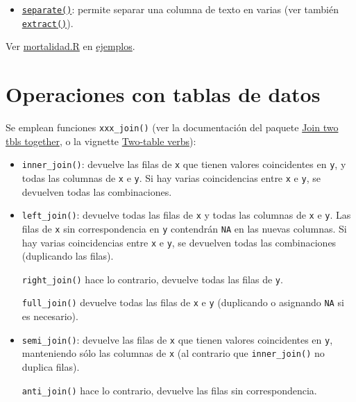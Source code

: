 \documentclass[
]{book}
\providecommand{\tightlist}{%
  \setlength{\itemsep}{0pt}\setlength{\parskip}{0pt}}
\theoremstyle{break}
\theoremstyle{nonumberplain}
\begin{document}
\begin{itemize}
\tightlist
\item
  \href{https://tidyr.tidyverse.org/reference/separate.html}{\texttt{separate()}}: permite separar una columna de texto en varias (ver también \href{https://tidyr.tidyverse.org/reference/extract.html}{\texttt{extract()}}).
\end{itemize}

Ver \href{ejemplos/mortalidad/mortalidad.R}{mortalidad.R} en \href{https://github.com/rubenfcasal/book_notasr/tree/main/ejemplos}{ejemplos}.

\section{Operaciones con tablas de datos}\label{dplyr-join}

Se emplean funciones \texttt{xxx\_join()} (ver la documentación del paquete
\href{https://dplyr.tidyverse.org/reference/join.html}{Join two tbls together},
o la vignette \href{https://dplyr.tidyverse.org/articles/two-table.html}{Two-table verbs}):

\begin{itemize}
\item
  \texttt{inner\_join()}: devuelve las filas de \texttt{x} que tienen valores coincidentes en \texttt{y},
  y todas las columnas de \texttt{x} e \texttt{y}. Si hay varias coincidencias entre \texttt{x} e \texttt{y},
  se devuelven todas las combinaciones.
\item
  \texttt{left\_join()}: devuelve todas las filas de \texttt{x} y todas las columnas de \texttt{x} e \texttt{y}.
  Las filas de \texttt{x} sin correspondencia en \texttt{y} contendrán \texttt{NA} en las nuevas columnas.
  Si hay varias coincidencias entre \texttt{x} e \texttt{y}, se devuelven todas las combinaciones
  (duplicando las filas).

  \texttt{right\_join()} hace lo contrario, devuelve todas las filas de \texttt{y}.

  \texttt{full\_join()} devuelve todas las filas de \texttt{x} e \texttt{y} (duplicando o asignando \texttt{NA} si es necesario).
\item
  \texttt{semi\_join()}: devuelve las filas de \texttt{x} que tienen valores coincidentes en \texttt{y},
  manteniendo sólo las columnas de \texttt{x} (al contrario que \texttt{inner\_join()} no duplica filas).

  \texttt{anti\_join()} hace lo contrario, devuelve las filas sin correspondencia.
\end{itemize}
\end{document}
